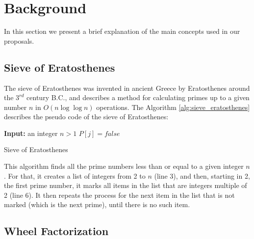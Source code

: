 \documentclass[runningheads,a4paper]{llncs}
\begin{document}
\section{Background}
\label{Background}

In this section we present a brief explanation of the main concepts used in our proposals.

\subsection{Sieve of Eratosthenes}
\label{Sieve of Eratosthenes}

The sieve of Eratosthenes \cite{eratosthenes2009neill} was invented in ancient Greece by Eratosthenes around the $3^{rd}$ century B.C., and describes a method for calculating primes up to a given number $n$ in $O(n \log{\log{n}})$ operations. The Algorithm \ref{alg:sieve_eratosthenes} describes the pseudo code of the sieve of Eratosthenes:


\begin{algorithm}[h]
        \begin{algorithmic}[1]
                \State \textbf{Input:} an integer $n > 1$
                \Statex
                                        \State $P[j] = false$
                                \EndFor
                        \EndIf
                \EndFor
                \Statex
        \end{algorithmic}
        \caption{Sieve of Eratosthenes}
        \label{alg:sieve_eratosthenes}
\end{algorithm}

This algorithm finds all the prime numbers less than or equal to a given integer $n$. For that, it creates a list of integers from 2 to $n$ (line 3), and then, starting in 2, the first prime number, it marks all items in the list that are integers multiple of 2 (line 6). It then repeats the process for the next item in the list that is not marked (which is the next prime), until there is no such item. 


\subsection{Wheel Factorization}
\label{Wheel Factorization}
\end{document}

